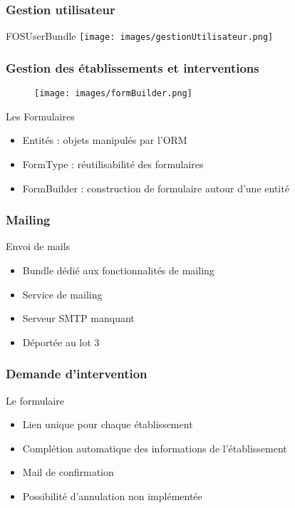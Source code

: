 \speaker{\Florian}

\begin{frame}
\frametitle{Gestion utilisateur}
\begin{block}{FOSUserBundle}
	\texttt{[image: images/gestionUtilisateur.png]}
\end{block}
\end{frame}

\begin{frame}
\frametitle{Gestion des établissements et interventions}
\begin{minipage}[c]{.3\linewidth}
      \begin{figure}[r]
		\texttt{[image: images/formBuilder.png]}
	  \end{figure}
   \end{minipage} \hfill
   \begin{minipage}[c]{.4\linewidth}
      \begin{block}{Les Formulaires}
		\begin{itemize}
			\item Entités : objets manipulés par l'ORM
			\item FormType : réutilisabilité des formulaires
			\item FormBuilder : construction de formulaire autour d'une entité
		\end{itemize}
	  \end{block}
   \end{minipage} \hfill
\end{frame}

\begin{frame}
\frametitle{Mailing}
\begin{block}{Envoi de mails}
	\begin{itemize}
		\item Bundle dédié aux fonctionnalités de mailing
		\item Service de mailing
		\item Serveur SMTP manquant
		\item Déportée au lot 3
	\end{itemize}
\end{block}
\end{frame}

\begin{frame}
\frametitle{Demande d'intervention}
\begin{block}{Le formulaire}
	\begin{itemize}
		\item Lien unique pour chaque établissement
		\item Complétion automatique des informations de l'établissement
		\item Mail de confirmation
		\item Possibilité d'annulation non implémentée
	\end{itemize}
\end{block}
\end{frame}